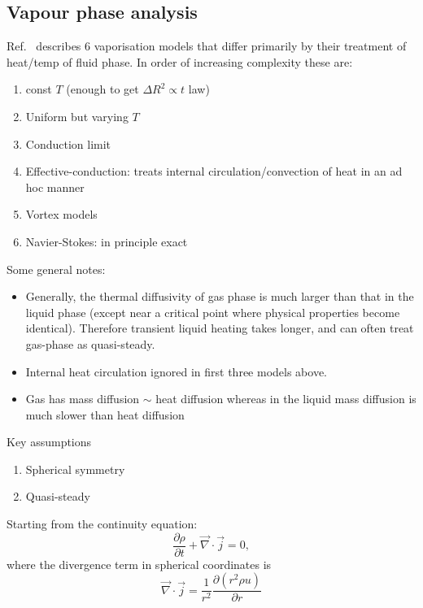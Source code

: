 \documentclass[11pt,twoside]{report}
\begin{document}
\subsection{Vapour phase analysis}

Ref.\ \cite{Sirignano2010} describes 6 vaporisation models that differ primarily by their treatment of heat/temp of fluid phase.
In order of increasing complexity these are:
\begin{enumerate}
\item const $T$ (enough to get $\Delta R^2 \propto t$ law)
\item Uniform but varying $T$
\item Conduction limit
\item Effective-conduction: treats internal circulation/convection of heat in an ad hoc manner
\item Vortex models
\item Navier-Stokes: in principle exact
\end{enumerate}

Some general notes:
\begin{itemize}
\item Generally, the thermal diffusivity of gas phase is much larger than that in the liquid phase (except near a critical point where physical properties become identical).
  Therefore transient liquid heating takes longer, and can often treat gas-phase as quasi-steady.
\item Internal heat circulation ignored in first three models above.
\item Gas has mass diffusion $\sim$ heat diffusion whereas in the liquid mass diffusion is much slower than heat diffusion
\end{itemize}

Key assumptions
\begin{enumerate}
\item Spherical symmetry
\item Quasi-steady
\end{enumerate}

Starting from the continuity equation:
\begin{equation}\label{eq:continuity-eqn}
  \frac{\partial \rho}{\partial t}
  + \vec{\nabla} \cdot \vec{j} = 0,
\end{equation}
where the divergence term in spherical coordinates is
\begin{equation}
  \vec{\nabla} \cdot \vec{j} =
  \frac{1}{r^2} \frac{\partial (r^2 \rho u)}{\partial r}
\end{equation}
\end{document}
